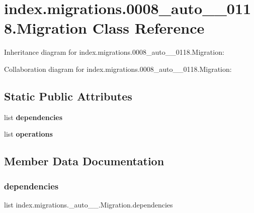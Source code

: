 \hypertarget{classindex_1_1migrations_1_10008__auto__20171016__0118_1_1Migration}{}\section{index.\+migrations.0008\+\_\+auto\+\_\+\_\+0118.Migration Class Reference}
\label{classindex_1_1migrations_1_10008__auto__20171016__0118_1_1Migration}


Inheritance diagram for index.\+migrations.0008\+\_\+auto\+\_\+\_\+0118.Migration\+:


Collaboration diagram for index.\+migrations.0008\+\_\+auto\+\_\+\_\+0118.Migration\+:
\subsection*{Static Public Attributes}
\begin{DoxyCompactItemize}
\item 
list {\bfseries dependencies}
\item 
list {\bfseries operations}
\end{DoxyCompactItemize}


\subsection{Member Data Documentation}
\mbox{\label{classindex_1_1migrations_1_10008__auto__20171016__0118_1_1Migration_ad66f7a16940bd67a143ca88c80a26256}} 
\subsubsection{\texorpdfstring{dependencies}{dependencies}}
{\footnotesize\ttfamily list index.\+migrations.\+\_\+auto\+\_\+\_.\+Migration.\+dependencies\hspace{0.3cm}{\ttfamily [static]}}


